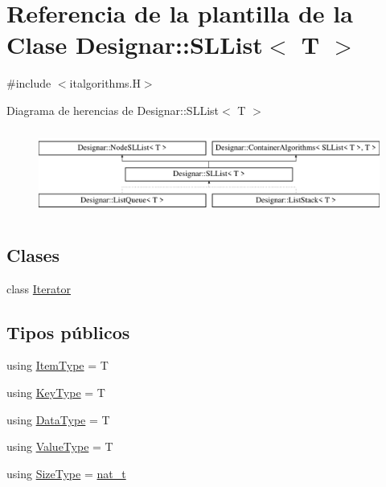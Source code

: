 \hypertarget{class_designar_1_1_s_l_list}{}\section{Referencia de la plantilla de la Clase Designar\+:\+:S\+L\+List$<$ T $>$}
\label{class_designar_1_1_s_l_list}


{\ttfamily \#include $<$italgorithms.\+H$>$}

Diagrama de herencias de Designar\+:\+:S\+L\+List$<$ T $>$\begin{figure}[H]
\begin{center}
\leavevmode
\includegraphics[height=2.837838cm]{class_designar_1_1_s_l_list}
\end{center}
\end{figure}
\subsection*{Clases}
\begin{DoxyCompactItemize}
\item 
class \hyperlink{class_designar_1_1_s_l_list_1_1_iterator}{Iterator}
\end{DoxyCompactItemize}
\subsection*{Tipos públicos}
\begin{DoxyCompactItemize}
\item 
using \hyperlink{class_designar_1_1_s_l_list_a8ec47bfb6b0d74c8f85111b7b3c05cb2}{Item\+Type} = T
\item 
using \hyperlink{class_designar_1_1_s_l_list_a0f9ac3eaee2d1a9e6091aaaac825ccb2}{Key\+Type} = T
\item 
using \hyperlink{class_designar_1_1_s_l_list_aa98659227d90b392a1b52fa5e9b292f4}{Data\+Type} = T
\item 
using \hyperlink{class_designar_1_1_s_l_list_a22813e78b0dea3a55f47d5f476fd99a1}{Value\+Type} = T
\item 
using \hyperlink{class_designar_1_1_s_l_list_a253792b5e9c19ea61fb49e5e83f6159b}{Size\+Type} = \hyperlink{namespace_designar_aa72662848b9f4815e7bf31a7cf3e33d1}{nat\+\_\+t}
\end{DoxyCompactItemize}
